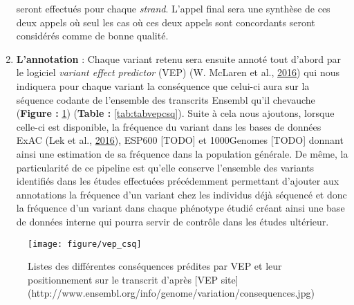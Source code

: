 \documentclass[12pt,twoside]{reedthesis}
\theoremstyle{definition}
\theoremstyle{definition}
\theoremstyle{remark}
\begin{document}
\begin{enumerate}
    seront effectués pour chaque \emph{strand}. L'appel final sera une
    synthèse de ces deux appels où seul les cas où ces deux appels sont
    concordants seront considérés comme de bonne qualité.\\
  \item
    \textbf{L'annotation} : Chaque variant retenu sera ensuite annoté tout
    d'abord par le logiciel \emph{variant effect predictor} (VEP) (W.
    McLaren et al., \protect\hyperlink{ref-McLaren2016}{2016}) qui nous
    indiquera pour chaque variant la conséquence que celui-ci aura sur la
    séquence codante de l'ensemble des transcrits Ensembl qu'il chevauche
    (\textbf{Figure : }\ref{fig:figvepcsq}) (\textbf{Table :
    }\ref{tab:tabvepcsq}). Suite à cela nous ajoutons, lorsque celle-ci
    est disponible, la fréquence du variant dans les bases de données ExAC
    (Lek et al., \protect\hyperlink{ref-Lek2016}{2016}), ESP600 {[}TODO{]}
    et 1000Genomes {[}TODO{]} donnant ainsi une estimation de sa fréquence
    dans la population générale. De même, la particularité de ce pipeline
    est qu'elle conserve l'ensemble des variants identifiés dans les
    études effectuées précédemment permettant d'ajouter aux annotations la
    fréquence d'un variant chez les individus déjà séquencé et donc la
    fréquence d'un variant dans chaque phénotype étudié créant ainsi une
    base de données interne qui pourra servir de contrôle dans les études
    ultérieur.
  \end{enumerate}
  
  \begin{figure}
  
  {\centering \texttt{[image: figure/vep\_csq]} 
  
  }
  
  \caption[Listes des différentes conséquences prédites par VEP et leur positionnement sur le transcrit]{Listes des différentes conséquences prédites par VEP et leur positionnement sur le transcrit d'après [VEP site](http://www.ensembl.org/info/genome/variation/consequences.jpg)}\label{fig:figvepcsq}
  \end{figure}
  
\end{document}
